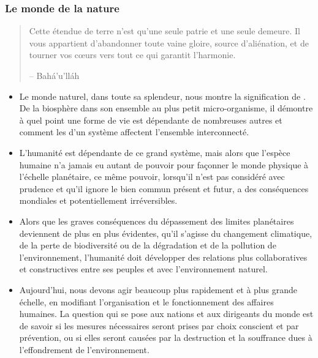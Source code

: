 \documentclass[11pt,xcolor={dvipsnames},hyperref={pdftex,pdfpagemode=UseNone,hidelinks,pdfdisplaydoctitle=true},usepdftitle=false]{beamer}
\begin{document}
\begin{frame}
\end{frame}

\begin{frame}[allowframebreaks=0.8]
  \frametitle{Le monde de la nature}
  \begin{quote}
     Cette étendue de terre n’est qu’une seule patrie et une seule demeure. Il 
     vous appartient d’abandonner toute vaine gloire, source d’aliénation, et 
     de tourner vos cœurs vers tout ce qui garantit l’harmonie.

     \raggedleft -- Bahá'u'lláh
  \end{quote}
  \begin{itemize}
    \item Le monde naturel, dans toute sa splendeur, nous montre la
      signification de . De la biosphère dans son ensemble au
      plus petit micro-organisme, il démontre à quel point une forme de vie est
      dépendante de nombreuses autres et comment les  d'un système
      affectent l'ensemble interconnecté.
    \item L'humanité est dépendante de ce grand système, mais alors que
      l'espèce humaine n'a jamais eu autant de pouvoir pour façonner le monde
      physique à l'échelle planétaire, ce même pouvoir, lorsqu'il n'est pas
      considéré avec prudence et qu'il ignore le bien commun présent et futur,
      a des conséquences mondiales et potentiellement irréversibles.
    \item Alors que les graves conséquences du dépassement des limites
      planétaires deviennent de plus en plus évidentes, qu'il s'agisse du
      changement climatique, de la perte de biodiversité ou de la dégradation et
      de la pollution de l'environnement, l'humanité doit développer des
      relations plus collaboratives et constructives entre ses peuples et avec
      l'environnement naturel.
    \item Aujourd'hui, nous devons agir beaucoup plus rapidement et à plus
      grande échelle, en modifiant l'organisation et le fonctionnement des
      affaires humaines. La question qui se pose aux nations et aux dirigeants
      du monde est de savoir si les mesures nécessaires seront prises par choix
      conscient et par prévention, ou si elles seront causées par la
      destruction et la souffrance dues à l'effondrement de l'environnement.
  \end{itemize}
\end{frame}
\end{document}
